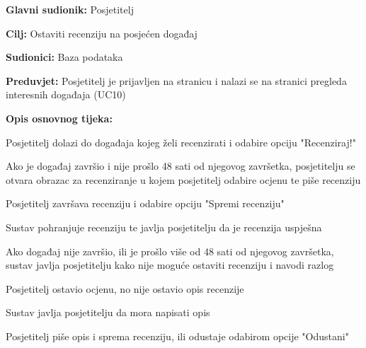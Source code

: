 					\noindent {}
\begin{packed_item}
	\item \textbf{Glavni sudionik:} Posjetitelj
	\item  \textbf{Cilj:} Ostaviti recenziju na posjećen događaj
	\item  \textbf{Sudionici:} Baza podataka
	\item  \textbf{Preduvjet:} Posjetitelj je prijavljen na stranicu i nalazi se na stranici pregleda interesnih događaja (UC10)
	\item  \textbf{Opis osnovnog tijeka:}
	
	\item[] \begin{packed_enum}
		
		\item Posjetitelj dolazi do događaja kojeg želi recenzirati i odabire opciju "Recenziraj!"
		\item Ako je događaj završio i nije prošlo 48 sati od njegovog završetka, posjetitelju se otvara obrazac za recenziranje u kojem posjetitelj odabire ocjenu te piše recenziju
		\item Posjetitelj završava recenziju i odabire opciju "Spremi recenziju"
		\item Sustav pohranjuje recenziju te javlja posjetitelju da je recenzija uspješna
		\item Ako događaj nije završio, ili je prošlo više od 48 sati od njegovog završetka, sustav javlja posjetitelju kako nije moguće ostaviti recenziju i navodi razlog
	\end{packed_enum}
			\item[2.a] Posjetitelj ostavio ocjenu, no nije ostavio opis recenzije
	\item[] \begin{packed_enum}
		
		\item Sustav javlja posjetitelju da mora napisati opis
		\item Posjetitelj piše opis i sprema recenziju, ili odustaje odabirom opcije "Odustani"
		
	\end{packed_enum}
	
\end{packed_item}

